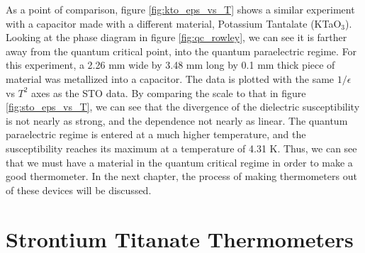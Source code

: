\documentclass{thesis-umich}
\begin{document}
As a point of comparison, figure \ref{fig:kto_eps_vs_T} shows a similar experiment with a capacitor made with a different material, Potassium Tantalate (KTaO$_3$). Looking at the phase diagram in figure \ref{fig:qc_rowley}, we can see it is farther away from the quantum critical point, into the quantum paraelectric regime. For this experiment, a 2.26 mm wide by 3.48 mm long by 0.1 mm thick piece of material was metallized into a capacitor. The data is plotted with the same $1/\epsilon$ vs $T^2$ axes as the STO data. By comparing the scale to that in figure \ref{fig:sto_eps_vs_T}, we can see that the divergence of the dielectric susceptibility is not nearly as strong, and the dependence not nearly as linear. The quantum paraelectric regime is entered at a much higher temperature, and the susceptibility reaches its maximum at a temperature of 4.31 K. Thus, we can see that we must have a material in the quantum critical regime in order to make a good thermometer. In the next chapter, the process of making thermometers out of these devices will be discussed. 

\section{Strontium Titanate Thermometers}
\end{document}

